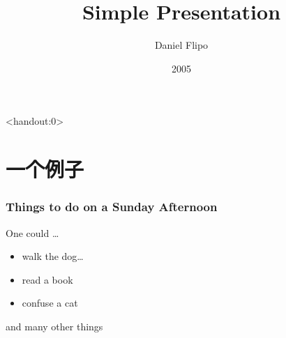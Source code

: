 \documentclass[10pt]{beamer}
\title{Simple Presentation}
\author[D. Flipo]{Daniel Flipo}
\institute{U.S.T.L. \& GUTenberg}
\date{2005}
\begin{document}
\begin{frame}<handout:0>
\titlepage
\end{frame}
\section{一个例子}
\begin{frame}
\frametitle{Things to do on a Sunday Afternoon}
\begin{block}{One could \ldots}
\begin{itemize}
\item walk the dog\dots \pause
\item read a book\pause
\item confuse a cat\pause
\end{itemize}
\end{block}
and many other things
\end{frame}
\end{document}
